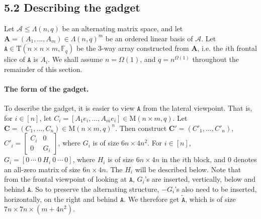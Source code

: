 \documentclass[10pt,a4paper]{article}
\begin{document}
\subsection*{5.2 Describing the gadget}
Let $\mathcal A\le\Lambda(n,q)$ be an alternating matrix space, and let $\mathbf A=(A_1,\ldots,A_m)\in\Lambda(n,q)^m$ be an ordered linear basis of $\mathcal A$. Let $\mathtt A\in\mathrm T(n\times n\times m,\mathbb F_q)$ be the 3-way array constructed from $\mathbf A$, i.e. the $i$th frontal slice of $\mathtt A$ is $A_i$.
We shall assume $n=\Omega(1)$, and $q=n^{\Omega(1)}$ throughout the remainder of this section.
\paragraph{The form of the gadget.} To describe the gadget, it is easier to view $\mathtt A$ from the lateral viewpoint. That is, for $i\in[n]$, let $C_i=[A_1e_i,\ldots,A_me_i]\in\mathrm M(n\times m,q)$. Let $\mathbf C=(C_1,\ldots,C_n)\in\mathrm M(n\times m,q)^n$. Then construct $\mathbf C'=(C'_1,\ldots,C'_n)$, $C'_i=\begin{bmatrix}C_i&0\\0&G_i\end{bmatrix}$, where $G_i$ is of size $6n\times4n^2$. For $i\in[n]$, $G_i=[0\ \cdots\ 0\ H_i\ 0\ \cdots\ 0]$, where $H_i$ is of size $6n\times4n$ in the $i$th block, and 0 denotes an all-zero matrix of size $6n\times4n$. The $H_i$ will be described below.
Note that from the frontal viewpoint of looking at $\mathtt A$, $G_i$'s are inserted, vertically, below and behind $\mathtt A$. So to preserve the alternating structure, $-G_i$'s also need to be inserted, horizontally, on the right and behind $\mathtt A$. We therefore get $\widetilde{\mathtt A}$, which is of size $7n\times7n\times(m+4n^2)$.
\end{document}
